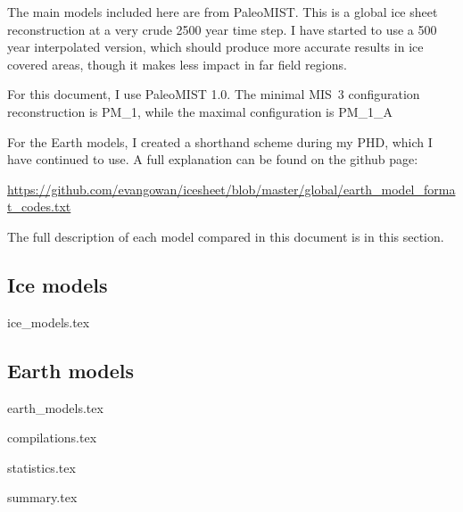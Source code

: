 \documentclass[a4paper,12pt]{article}
\begin{document}
The main models included here are from PaleoMIST. This is a global ice sheet reconstruction at a very crude 2500 year time step. I have started to use a 500 year interpolated version, which should produce more accurate results in ice covered areas, though it makes less impact in far field regions.

For this document, I use PaleoMIST 1.0. The minimal MIS~3 configuration reconstruction is PM\_1, while the maximal configuration is PM\_1\_A


For the Earth models, I created a shorthand scheme during my PHD, which I have continued to use. A full explanation can be found on the github page:

\url{https://github.com/evangowan/icesheet/blob/master/global/earth_model_format_codes.txt}

The full description of each model compared in this document is in this section.



\subsection{Ice models}

{ice_models.tex}

\subsection{Earth models}

{earth_models.tex}

\newpage


{compilations.tex}

\newpage

{statistics.tex}


\newpage

{summary.tex}

\clearpage

\newpage



\end{document}
